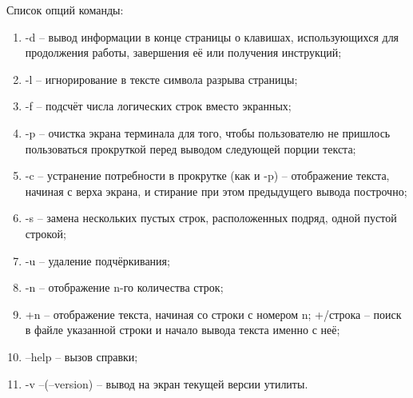 Список опций команды:
\begin{enumerate}
    \item -d -- вывод информации в конце страницы о клавишах, использующихся для продолжения работы, завершения её или получения инструкций;
    \item -l -- игнорирование в тексте символа разрыва страницы;
    \item -f -- подсчёт числа логических строк вместо экранных;
    \item -p -- очистка экрана терминала для того, чтобы пользователю не пришлось пользоваться прокруткой перед выводом следующей порции текста;
    \item -c -- устранение потребности в прокрутке (как и -p) -- отображение текста, начиная с верха экрана, и стирание при этом предыдущего вывода построчно;
    \item -s -- замена нескольких пустых строк, расположенных подряд, одной пустой строкой;
    \item -u -- удаление подчёркивания;
    \item -n -- отображение n-го количества строк;
    \item +n -- отображение текста, начиная со строки с номером n;
    +/строка -- поиск в файле указанной строки и начало вывода текста именно с неё;
    \item --help -- вызов справки;
    \item -v --(--version) -- вывод на экран текущей версии утилиты.
\end{enumerate}

